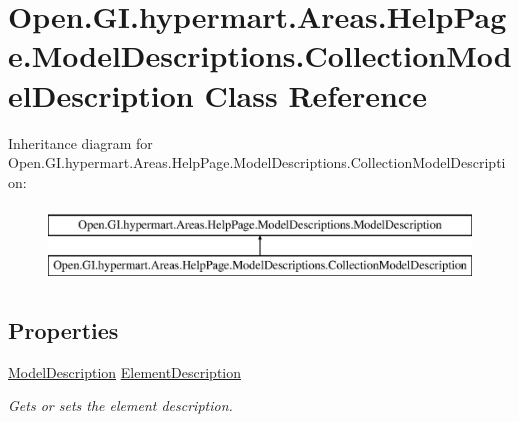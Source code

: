 \hypertarget{class_open_1_1_g_i_1_1hypermart_1_1_areas_1_1_help_page_1_1_model_descriptions_1_1_collection_model_description}{}\section{Open.\+G\+I.\+hypermart.\+Areas.\+Help\+Page.\+Model\+Descriptions.\+Collection\+Model\+Description Class Reference}
\label{class_open_1_1_g_i_1_1hypermart_1_1_areas_1_1_help_page_1_1_model_descriptions_1_1_collection_model_description}


 


Inheritance diagram for Open.\+G\+I.\+hypermart.\+Areas.\+Help\+Page.\+Model\+Descriptions.\+Collection\+Model\+Description\+:\begin{figure}[H]
\begin{center}
\leavevmode
\includegraphics[height=2.000000cm]{class_open_1_1_g_i_1_1hypermart_1_1_areas_1_1_help_page_1_1_model_descriptions_1_1_collection_model_description}
\end{center}
\end{figure}
\subsection*{Properties}
\begin{DoxyCompactItemize}
\item 
\hyperlink{class_open_1_1_g_i_1_1hypermart_1_1_areas_1_1_help_page_1_1_model_descriptions_1_1_model_description}{Model\+Description} \hyperlink{class_open_1_1_g_i_1_1hypermart_1_1_areas_1_1_help_page_1_1_model_descriptions_1_1_collection_model_description_a4049e2a56d1af746b241c4ae2da109ca}{Element\+Description}
\begin{DoxyCompactList}\small\item\em Gets or sets the element description. \end{DoxyCompactList}\end{DoxyCompactItemize}


